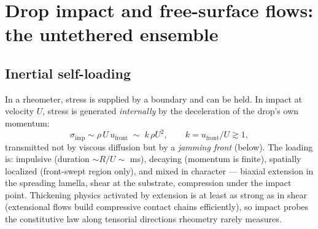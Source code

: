\documentclass[11pt]{article}
\begin{document}
\section{Drop impact and free-surface flows: the untethered ensemble}
\label{sec:freesurface}

\subsection{Inertial self-loading}
In a rheometer, stress is supplied by a boundary and can be held. In impact at velocity $U$, stress is generated \emph{internally} by the deceleration of the drop's own momentum:
\begin{equation}
\sigma_{\mathrm{imp}} \sim \rho\, U\, u_{\mathrm{front}} \;\sim\; k\,\rho U^{2}, \qquad k = u_{\mathrm{front}}/U \gtrsim 1,
\label{eq:impactstress}
\end{equation}
transmitted not by viscous diffusion but by a \emph{jamming front} (below). The loading is: impulsive (duration $\sim R/U \sim$ ms), decaying (momentum is finite), spatially localized (front-swept region only), and mixed in character --- biaxial extension in the spreading lamella, shear at the substrate, compression under the impact point. Thickening physics activated by extension is at least as strong as in shear (extensional flows build compressive contact chains efficiently), so impact probes the constitutive law along tensorial directions rheometry rarely measures.
\end{document}
